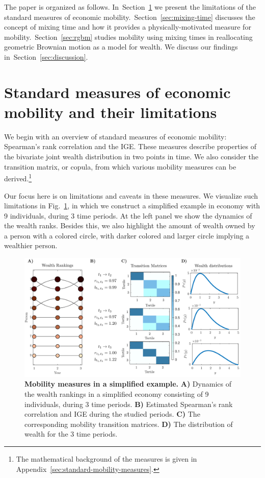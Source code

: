 \documentclass[11pt]{article}
\newcommand{\Sref}[1]{Section~\ref{sec:#1}}
\newcommand{\fref}[1]{Fig.~\ref{fig:#1}}
\numberwithin{equation}{section}
\begin{document}
The paper is organized as follows. In~\Sref{standard-measures} we present the limitations of the standard measures of economic mobility.~\Sref{mixing-time} discusses the concept of mixing time and how it provides a physically-motivated measure for mobility.~\Sref{rgbm} studies mobility using mixing times in reallocating geometric Brownian motion as a model for wealth. We discuss our findings in~\Sref{discussion}.

\section{Standard measures of economic mobility and their limitations}\label{sec:standard-measures}

We begin with an overview of standard measures of economic mobility: Spearman's rank correlation and the IGE. These measures describe properties of the bivariate joint wealth distribution in two points in time. We also consider the transition matrix, or copula, from which various mobility measures can be derived.\footnote{The mathematical background of the measures is given in Appendix~\ref{sec:standard-mobility-measures}.}

Our focus here is on limitations and caveats in these measures. We visualize such limitations in \fref{standard-mobility-measures}, in which we construct a simplified example in economy with 9 individuals, during 3 time periods. At the left panel we show the dynamics of the wealth ranks. Besides this, we also highlight the amount of wealth owned by a person with a colored circle, with darker colored and larger circle implying a wealthier person.

\begin{figure}[!htb]
\centering
\includegraphics[width=1.0\textwidth]{figs/fig_mobility_measures.pdf}
\caption{\textbf{Mobility measures in a simplified example.} \textbf{A)} Dynamics of the wealth rankings in a simplified economy consisting of 9 individuals, during 3 time periods. \textbf{B)} Estimated Spearman's rank correlation and IGE during the studied periods. \textbf{C)} The corresponding mobility transition matrices. \textbf{D)} The distribution of wealth for the 3 time periods.
\label{fig:standard-mobility-measures}}
\end{figure}
\end{document}
